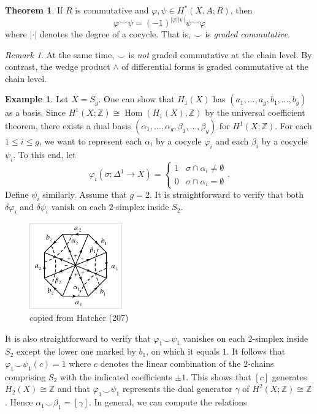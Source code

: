 \documentclass[10pt,letterpaper,cm]{nupset}
\theoremstyle{definition}
\newtheorem{exmp}[definition]{Example}
\theoremstyle{theorem}
\newtheorem{theorem}[definition]{Theorem}
\theoremstyle{remark}
\newtheorem{remark}[definition]{Remark}
\newcommand{\Z}{\mathbb Z}
\newcommand{\1}{\mathbb{1}}
\newcommand{\0}{\vec 0}
\DeclareMathOperator{\Hom}{Hom}
\begin{document}
\begin{theorem}
If $R$ is commutative and $\varphi, \psi \in H^{\ast}(X, A; R)$, then $$\varphi \smile \psi = \left({-1}\right)^{\left\lvert{\varphi}\right\rvert\left\lvert{\psi}\right\rvert} \psi \smile \varphi$$ where $\left\lvert{\cdot}\right\rvert$ denotes the degree of a cocycle. That is, $\smile$ is \textit{graded commutative}.
\end{theorem}

\begin{remark}
At the same time, $\smile$ is \emph{not} graded commutative at the chain level. By contrast, the wedge product $\wedge$ of differential forms is graded commutative at the chain level. 
\end{remark}

\begin{exmp}
Let $X = S_g$. One can show that $H_1(X)$ has $\left(a_1, \ldots, a_g, b_1, \ldots, b_g\right)$ as a basis. Since $H^1(X;\Z) \cong \Hom(H_1(X), \Z)$ by the universal coefficient theorem, there exists a dual basis $\left(\alpha_1, \ldots, \alpha_g, \beta_1, \ldots, \beta_g\right)$ for $H^1(X; \Z)$. 
For each $1\leq i\leq g$, we want to represent each $\alpha_i$ by a cocycle $\varphi_i$ and each $\beta_i$ by a cocycle $\psi_i$. To this end, let $$\varphi_i(\sigma : \Delta^1 \to X) = \begin{cases} 1 & \sigma \cap \alpha_i \ne \emptyset \\ 0 & \sigma \cap \alpha_i = \emptyset     \end{cases}.$$ Define $\psi_i$ similarly. Assume that $g=2$. It is straightforward to verify that both $\delta{\varphi_i}$ and $\delta{\psi_i}$ vanish on each $2$-simplex inside $S_2$.
\begin{figure}[H]
\centering
\includegraphics[width=40mm]{cup-prod-Sg.png}
\caption{copied from Hatcher (207) \label{overflow}}
\end{figure}
It is also straightforward to verify that $\varphi_1 \smile \psi_1$ vanishes on each $2$-simplex inside $S_2$ except the lower one marked by $b_1$, on which it equals $1$.
It follows that $\varphi_1 \smile \psi_1(c) =1$ where $c$ denotes the linear combination of the $2$-chains comprising $S_2$ with the indicated coefficients $\pm 1$. This shows that $[c]$ generates $H_2(X) \cong \Z$ and that $\varphi_1\smile \psi_1$ represents the dual generator $\gamma$ of $H^2(X; \Z) \cong \Z$. Hence $\alpha_1 \smile \beta_1 = [\gamma]$. In general, we can compute the relations

\end{exmp}
\end{document}
